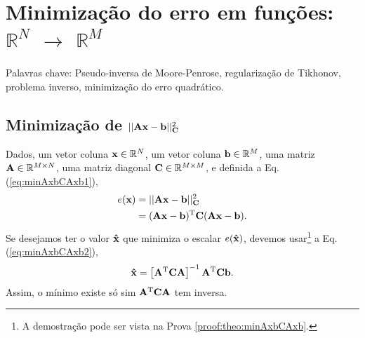 
\chapter{Minimização do erro em funções: $\mathbb{R}^{N}$ $\rightarrow$ $\mathbb{R}^{M}$}

\begin{remark}
Palavras chave: 
Pseudo-inversa de Moore-Penrose,
regularização de Tikhonov,
problema inverso, 
minimização do erro quadrático. 
\end{remark}

\section{Minimização de $||\MATRIX{A}\VECTOR{x}-\VECTOR{b}||_{\MATRIX{C}}^2$
}

\begin{theorem}\label{theo:minAxbCAxb}
Dados,
um vetor coluna $\VECTOR{x}\in \mathbb{R}^N$, 
um vetor coluna $\VECTOR{b}\in \mathbb{R}^M$,  
uma matriz $\MATRIX{A} \in \mathbb{R}^{M\times N}$, 
uma matriz diagonal $\MATRIX{C} \in \mathbb{R}^{M\times M}$, e 
definida a Eq. (\ref{eq:minAxbCAxb1}),
\begin{align}\label{eq:minAxbCAxb1}
e(\VECTOR{x}) & = ||\MATRIX{A}\VECTOR{x}-\VECTOR{b}||_{\MATRIX{C}}^2 \\
              & = (\MATRIX{A}\VECTOR{x}-\VECTOR{b})^{\transpose}\MATRIX{C}(\MATRIX{A}\VECTOR{x}-\VECTOR{b}).
\end{align}
Se desejamos ter o valor $\VECTOR{\hat{x}}$ que minimiza o escalar $e(\VECTOR{\hat{x}})$,
devemos usar\footnote{A demostração pode ser vista na Prova \ref{proof:theo:minAxbCAxb}.} a Eq. (\ref{eq:minAxbCAxb2}),
\begin{equation}\label{eq:minAxbCAxb2}
\VECTOR{\hat{x}} =
\left[ \MATRIX{A}^{\transpose}\MATRIX{C} \MATRIX{A} \right]^{-1}\MATRIX{A}^{\transpose}\MATRIX{C}\VECTOR{b}.
\end{equation}
Assim, o mínimo existe só sim $\MATRIX{A}^{\transpose}\MATRIX{C} \MATRIX{A}$ tem inversa.
\end{theorem}


